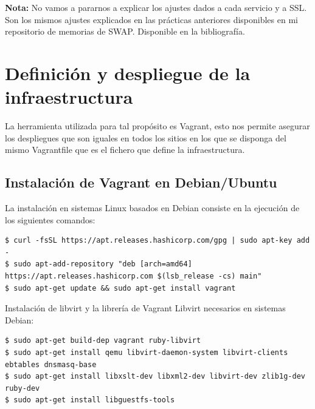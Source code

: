 \textbf{Nota:} No vamos a pararnos a explicar los ajustes dados a cada servicio y a SSL. Son los mismos ajustes explicados en las prácticas anteriores disponibles en mi repositorio de memorias de SWAP. Disponible en la bibliografía.



\newpage
\section{Definición y despliegue de la infraestructura}

La herramienta utilizada para tal propósito es Vagrant, esto nos permite asegurar los despliegues que son iguales en todos los sitios en los que se disponga del mismo Vagrantfile que es el fichero que define la infraestructura.
\vspace{5mm}

\subsection{Instalación de Vagrant en Debian/Ubuntu}

La instalación en sistemas Linux basados en Debian consiste en la ejecución de los siguientes comandos:

\begin{lstlisting}[style=mybash]
$ curl -fsSL https://apt.releases.hashicorp.com/gpg | sudo apt-key add -
$ sudo apt-add-repository "deb [arch=amd64] https://apt.releases.hashicorp.com $(lsb_release -cs) main"
$ sudo apt-get update && sudo apt-get install vagrant
\end{lstlisting}

Instalación de libvirt y la librería de Vagrant Libvirt necesarios en sistemas Debian:

\begin{lstlisting}[style=mybash]
$ sudo apt-get build-dep vagrant ruby-libvirt
$ sudo apt-get install qemu libvirt-daemon-system libvirt-clients ebtables dnsmasq-base
$ sudo apt-get install libxslt-dev libxml2-dev libvirt-dev zlib1g-dev ruby-dev
$ sudo apt-get install libguestfs-tools
\end{lstlisting}

